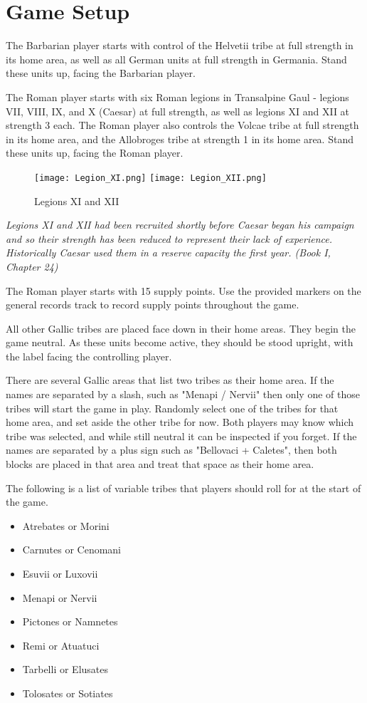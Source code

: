 \section{Game Setup}

The Barbarian player starts with control of the Helvetii tribe at full strength in its home area, as well as all German units at full strength in Germania. Stand these units up, facing the Barbarian player.

The Roman player starts with six Roman legions in Transalpine Gaul - legions VII, VIII, IX, and X (Caesar) at full strength, as well as legions XI and XII at strength 3 each. The Roman player also controls the Volcae tribe at full strength in its home area, and the Allobroges tribe at strength 1 in its home area. Stand these units up, facing the Roman player.

\begin{figure}[h]
  \centering
  \texttt{[image: Legion\_XI.png]}
  \hspace{10mm}
  \texttt{[image: Legion\_XII.png]}
  \caption*{Legions XI and XII}
\end{figure}

\textit{Legions XI and XII had been recruited shortly before Caesar began his campaign and so their strength has been reduced to represent their lack of experience. Historically Caesar used them in a reserve capacity the first year. (Book I, Chapter 24)}

The Roman player starts with 15 supply points. Use the provided markers on the general records track to record supply points throughout the game.

All other Gallic tribes are placed face down in their home areas. They begin the game neutral. As these units become active, they should be stood upright, with the label facing the controlling player.

There are several Gallic areas that list two tribes as their home area. If the names are separated by a slash, such as "Menapi / Nervii" then only one of those tribes will start the game in play. Randomly select one of the tribes for that home area, and set aside the other tribe for now. Both players may know which tribe was selected, and while still neutral it can be inspected if you forget. If the names are separated by a plus sign such as "Bellovaci + Caletes", then both blocks are placed in that area and treat that space as their home area.

The following is a list of variable tribes that players should roll for at the start of the game.

\begin{itemize}[nosep]
  \item Atrebates or Morini
  \item Carnutes or Cenomani
  \item Esuvii or Luxovii
  \item Menapi or Nervii
  \item Pictones or Namnetes
  \item Remi or Atuatuci
  \item Tarbelli or Elusates
  \item Tolosates or Sotiates
\end{itemize}
